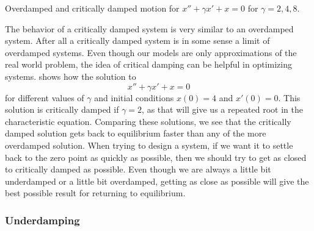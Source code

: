 \begin{mywrapfig}[18]{3.25in}
\capstart
{}
\caption{Overdamped and critically damped motion for $x'' + \gamma x' + x = 0$ for $\gamma = 2, 4, 8$.}\label{critdampedfast:fig}
\end{mywrapfig}

The behavior of a critically damped system is very similar to an overdamped
system.  After all a critically damped system is in some sense a limit
of overdamped systems. Even though our models are only approximations of the real world problem, the idea of critical damping can be helpful in optimizing systems.  shows how the solution to 
\begin{equation*}
x'' + \gamma x' + x = 0
\end{equation*} 
for different values of $\gamma$ and initial conditions $x(0) = 4$ and $x'(0) = 0$. This solution is critically damped if $\gamma = 2$, as that will give us a repeated root in the characteristic equation. Comparing these solutions, we see that the critically damped solution gets back to equilibrium faster than any of the more overdamped solution. When trying to design a system, if we want it to settle back to the zero point as quickly as possible, then we should try to get as closed to critically damped as possible.  Even though we are always a little bit underdamped or a little bit overdamped, getting as close as possible will give the best possible result for returning to equilibrium. 


\subsubsection{Underdamping}

